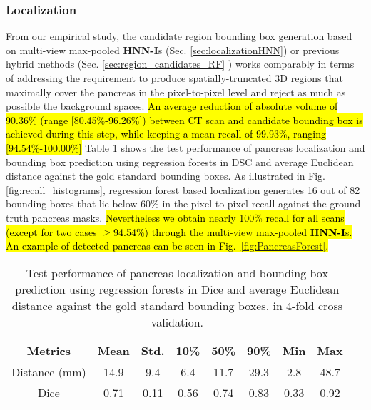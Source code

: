 \documentclass[journal]{IEEEtran}
\begin{document}
\subsubsection{Localization}
From our empirical study, the candidate region bounding box generation based on multi-view max-pooled \textbf{HNN-I}s (Sec. \ref{sec:localizationHNN}) or previous hybrid methods (Sec. \ref{sec:region_candidates_RF} \cite{farag2014bottom}) works comparably in terms of addressing the requirement to produce spatially-truncated 3D regions that maximally cover the pancreas in the pixel-to-pixel level and reject as much as possible the background spaces. \hl{An average reduction of absolute volume of 90.36\% (range [80.45\%-96.26\%]) between CT scan and candidate bounding box is achieved during this step, while keeping a mean recall of 99.93\%, ranging [94.54\%-100.00\%]} Table \ref{tbl:PancreasForestPerformance} shows the test performance of pancreas localization and bounding box prediction using regression forests in DSC and average Euclidean distance against the gold standard bounding boxes. As illustrated in Fig. \ref{fig:recall_histograms}, regression forest based localization generates 16 out of 82 bounding boxes that lie below 60\% in the pixel-to-pixel recall against the ground-truth pancreas masks. \hl{Nevertheless we obtain nearly 100\% recall for all scans (except for two cases $\geq$94.54\%) through the multi-view max-pooled \textbf{HNN-I}s. An example of detected pancreas can be seen in Fig.~\ref{fig:PancreasForest}.}
\begin{table}[H]
\centering
\begin{tabular}{c|c|c|c|c|c|c|c}
	\toprule
	\toprule
Metrics & Mean & Std. & 10\% & 50\% & 90\% & Min & Max \\
	\midrule       
Distance (mm) & 14.9 & 9.4 & 6.4 & 11.7 & 29.3 & 2.8 & 48.7 \\
Dice & 0.71 & 0.11 & 0.56 & 0.74 & 0.83 & 0.33 & 0.92 \\
	\bottomrule
	\bottomrule
\end{tabular}
\caption{\small Test performance of pancreas localization and bounding box prediction using regression forests in Dice and average Euclidean distance against the gold standard bounding boxes, in 4-fold cross validation.} 
\label{tbl:PancreasForestPerformance}
\end{table}
\end{document}
